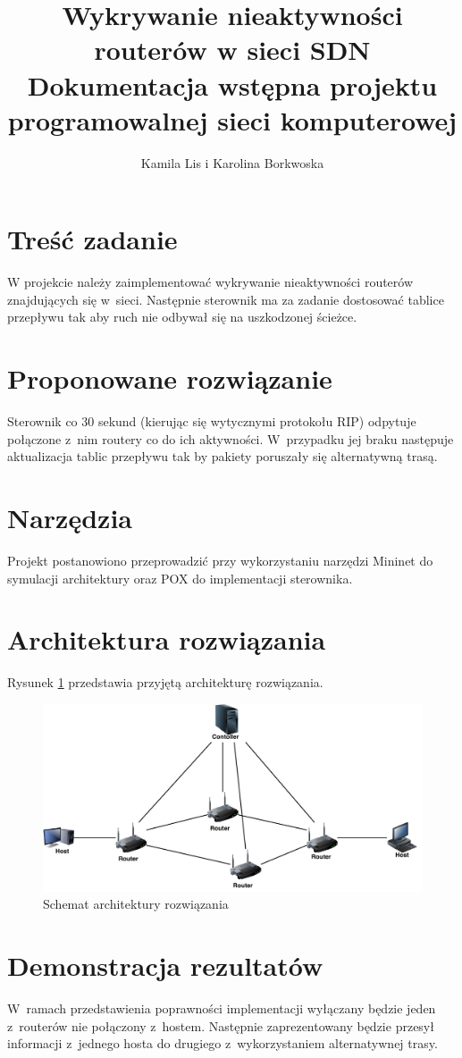 \documentclass{article}
\date{}
\author{Kamila Lis i Karolina Borkwoska}
\title{Wykrywanie nieaktywności routerów w sieci SDN\\
	{\large Dokumentacja wstępna projektu programowalnej sieci komputerowej}}
\begin{document}
	\maketitle
	\section{Treść zadanie}
	W projekcie należy zaimplementować wykrywanie nieaktywności routerów znajdujących się w~sieci. Następnie sterownik ma za zadanie dostosować tablice przepływu tak aby ruch nie odbywał się na uszkodzonej ścieżce.
	\section{Proponowane rozwiązanie} 
	Sterownik co 30 sekund (kierując się wytycznymi protokołu RIP) odpytuje połączone z~nim routery co do ich aktywności. W~przypadku jej braku następuje aktualizacja tablic przepływu tak by pakiety poruszały się alternatywną trasą.
	\section{Narzędzia}
	Projekt postanowiono przeprowadzić przy wykorzystaniu narzędzi Mininet do symulacji architektury oraz POX do implementacji sterownika.
	\section{Architektura rozwiązania}
	Rysunek \ref{f:arch} przedstawia przyjętą architekturę rozwiązania. 
	\begin{figure}[H]
		\centering
		\includegraphics[scale = 0.60]{../images/psik_topology.pdf}
		\caption{Schemat architektury rozwiązania}
		\label{f:arch}
	\end{figure}	
	\section{Demonstracja rezultatów}
	W~ramach przedstawienia poprawności implementacji wyłączany będzie jeden z~routerów nie połączony z~hostem. Następnie zaprezentowany będzie przesył informacji z~jednego hosta do drugiego z~wykorzystaniem alternatywnej trasy. 
\end{document}
